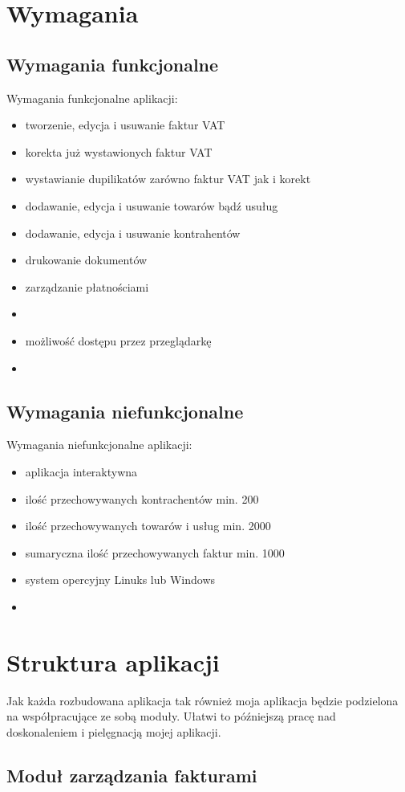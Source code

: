 \section{Wymagania}
\subsection{Wymagania funkcjonalne}
Wymagania funkcjonalne aplikacji:
\begin{itemize}
  \item tworzenie, edycja i usuwanie faktur VAT
  \item korekta już wystawionych faktur VAT
  \item wystawianie dupilikatów zarówno faktur VAT jak i korekt
  \item dodawanie, edycja i usuwanie towarów bądź usuług
  \item dodawanie, edycja i usuwanie kontrahentów
  \item drukowanie dokumentów
  \item zarządzanie płatnościami
  \item 
  \item możliwość dostępu przez przeglądarkę
  \item 
\end{itemize}
\subsection{Wymagania niefunkcjonalne}
Wymagania niefunkcjonalne aplikacji:
\begin{itemize}
  \item aplikacja interaktywna
  \item ilość przechowywanych kontrachentów min. 200
  \item ilość przechowywanych towarów i usług min. 2000
  \item sumaryczna ilość przechowywanych faktur min. 1000
  \item system opercyjny Linuks lub Windows
  \item 
\end{itemize}

\section{Struktura aplikacji}
Jak każda rozbudowana aplikacja tak również moja aplikacja będzie podzielona na
współpracujące ze sobą moduły. Ułatwi to późniejszą pracę nad doskonaleniem i
pielęgnacją mojej aplikacji.
\subsection{Moduł zarządzania fakturami}
